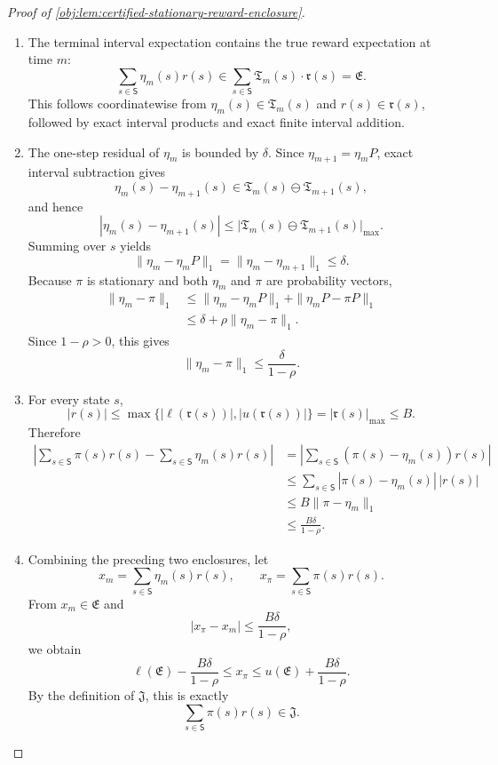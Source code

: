 \documentclass[11pt]{article}
\begin{document}
\begin{proof}[Proof of \cref{obj:lem:certified-stationary-reward-enclosure}]
\begin{enumerate}
\item The terminal interval expectation contains the true reward expectation at time \(m\):
\[
\sum_{s\in\mathsf S}\eta_m(s)r(s)
   \in
\sum_{s\in\mathsf S}\mathfrak T_m(s)\cdot\mathfrak r(s)
   =\mathfrak E.
\]
This follows coordinatewise from \(\eta_m(s)\in\mathfrak T_m(s)\) and \(r(s)\in\mathfrak r(s)\), followed by exact interval products and exact finite interval addition. %

\item The one-step residual of \(\eta_m\) is bounded by \(\delta\).  Since \(\eta_{m+1}=\eta_mP\), exact interval subtraction gives
\[
\eta_m(s)-\eta_{m+1}(s)
   \in \mathfrak T_m(s)\ominus\mathfrak T_{m+1}(s),
\]
and hence
\[
|\eta_m(s)-\eta_{m+1}(s)|
   \le \bigl|\mathfrak T_m(s)\ominus\mathfrak T_{m+1}(s)\bigr|_{\max}.
\]
Summing over \(s\) yields
\[
\|\eta_m-\eta_mP\|_1
   =\|\eta_m-\eta_{m+1}\|_1
   \le \delta.
\]
Because \(\pi\) is stationary and both \(\eta_m\) and \(\pi\) are probability vectors,
\[
\begin{aligned}
\|\eta_m-\pi\|_1
&\le \|\eta_m-\eta_mP\|_1+\|\eta_mP-\pi P\|_1\\
&\le \delta+\rho\|\eta_m-\pi\|_1 .
\end{aligned}
\]
Since \(1-\rho>0\), this gives
\[
\|\eta_m-\pi\|_1\le \frac{\delta}{1-\rho}.
\]

\item For every state \(s\),
\[
|r(s)|
   \le \max\{|\ell(\mathfrak r(s))|,|u(\mathfrak r(s))|\}
   =|\mathfrak r(s)|_{\max}
   \le B.
\]
Therefore
\[
\begin{aligned}
\left|
\sum_{s\in\mathsf S}\pi(s)r(s)
-
\sum_{s\in\mathsf S}\eta_m(s)r(s)
\right|
&=
\left|\sum_{s\in\mathsf S}(\pi(s)-\eta_m(s))r(s)\right|\\
&\le \sum_{s\in\mathsf S}|\pi(s)-\eta_m(s)|\,|r(s)|\\
&\le B\|\pi-\eta_m\|_1\\
&\le \frac{B\delta}{1-\rho}.
\end{aligned}
\]

\item Combining the preceding two enclosures, let
\[
x_m=\sum_{s\in\mathsf S}\eta_m(s)r(s),
\qquad
x_\pi=\sum_{s\in\mathsf S}\pi(s)r(s).
\]
From \(x_m\in\mathfrak E\) and
\[
|x_\pi-x_m|\le \frac{B\delta}{1-\rho},
\]
we obtain
\[
\ell(\mathfrak E)-\frac{B\delta}{1-\rho}
\le x_\pi\le
u(\mathfrak E)+\frac{B\delta}{1-\rho}.
\]
By the definition of \(\mathfrak J\), this is exactly
\[
\sum_{s\in\mathsf S}\pi(s)r(s)\in\mathfrak J .
\]
\end{enumerate}
\end{proof}
\end{document}
